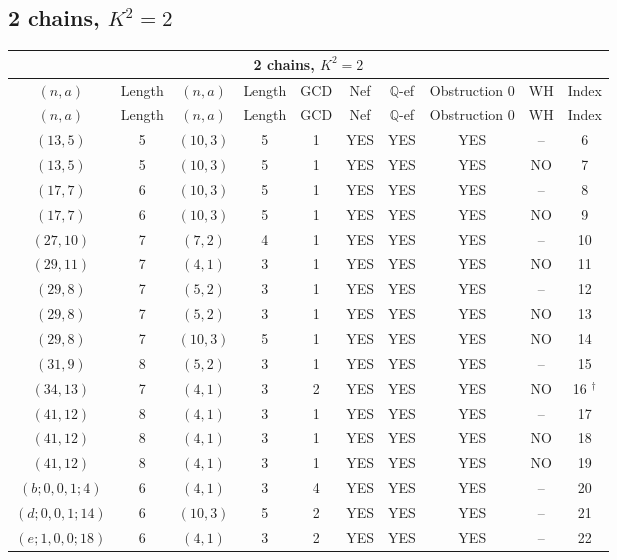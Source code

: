 \subsection{2 chains, \(K^2 = 2\)}
\begin{longtable}{|c|c|c|c|c|c|c|c|c|c|}
\hline
\multicolumn{10}{|c|}{2 chains, $K^2 = 2$}\\
\hline
$(n,a)$ & Length & $(n,a)$ & Length & GCD & Nef & $\mathbb Q$-ef & Obstruction 0 & WH & Index\\
\hline
\endfirsthead

\hline
$(n,a)$ & Length & $(n,a)$ & Length & GCD & Nef & $\mathbb Q$-ef & Obstruction 0 & WH & Index\\
\hline
\endhead
\hline
\endfoot

$(13, 5)$ & 5 & $(10, 3)$ & 5 & 1 & YES & YES & YES & -- & 6\\
$(13, 5)$ & 5 & $(10, 3)$ & 5 & 1 & YES & YES & YES & NO & 7\\
$(17, 7)$ & 6 & $(10, 3)$ & 5 & 1 & YES & YES & YES & -- & 8\\
$(17, 7)$ & 6 & $(10, 3)$ & 5 & 1 & YES & YES & YES & NO & 9\\
$(27, 10)$ & 7 & $(7, 2)$ & 4 & 1 & YES & YES & YES & -- & 10\\
$(29, 11)$ & 7 & $(4, 1)$ & 3 & 1 & YES & YES & YES & NO & 11\\
$(29, 8)$ & 7 & $(5, 2)$ & 3 & 1 & YES & YES & YES & -- & 12\\
$(29, 8)$ & 7 & $(5, 2)$ & 3 & 1 & YES & YES & YES & NO & 13\\
$(29, 8)$ & 7 & $(10, 3)$ & 5 & 1 & YES & YES & YES & NO & 14\\
$(31, 9)$ & 8 & $(5, 2)$ & 3 & 1 & YES & YES & YES & -- & 15\\
$(34, 13)$ & 7 & $(4, 1)$ & 3 & 2 & YES & YES & YES & NO & 16 ${}^\dagger$\\
$(41, 12)$ & 8 & $(4, 1)$ & 3 & 1 & YES & YES & YES & -- & 17\\
$(41, 12)$ & 8 & $(4, 1)$ & 3 & 1 & YES & YES & YES & NO & 18\\
$(41, 12)$ & 8 & $(4, 1)$ & 3 & 1 & YES & YES & YES & NO & 19\\
$(b; 0, 0, 1; 4)$ & 6 & $(4, 1)$ & 3 & 4 & YES & YES & YES & -- & 20\\
$(d; 0, 0, 1; 14)$ & 6 & $(10, 3)$ & 5 & 2 & YES & YES & YES & -- & 21\\
$(e; 1, 0, 0; 18)$ & 6 & $(4, 1)$ & 3 & 2 & YES & YES & YES & -- & 22
\end{longtable}
